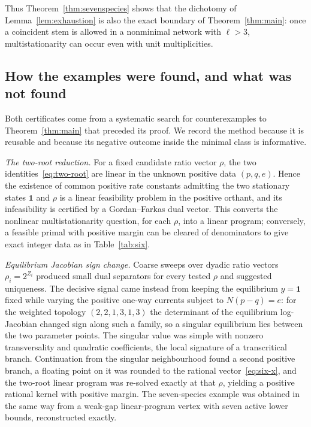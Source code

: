 \documentclass[11pt,reqno]{amsart}
\theoremstyle{plain}
\theoremstyle{definition}
\theoremstyle{remark}
\numberwithin{equation}{section}
\newcommand{\one}{\mathbf{1}}
\begin{document}
Thus Theorem~\ref{thm:sevenspecies} shows that the dichotomy of Lemma~\ref{lem:exhaustion} is also the exact boundary of Theorem~\ref{thm:main}: once a coincident stem is allowed in a nonminimal network with $\ell>3$, multistationarity can occur even with unit multiplicities.

\subsection{How the examples were found, and what was not found}\label{subsec:search}
Both certificates come from a systematic search for counterexamples to Theorem~\ref{thm:main} that preceded its proof.  We record the method because it is reusable and because its negative outcome inside the minimal class is informative.

\emph{The two-root reduction.}  For a fixed candidate ratio vector $\rho$, the two identities~\eqref{eq:two-root} are linear in the unknown positive data $(p,q,e)$.  Hence the existence of common positive rate constants admitting the two stationary states $\one$ and $\rho$ is a linear feasibility problem in the positive orthant, and its infeasibility is certified by a Gordan--Farkas dual vector.  This converts the nonlinear multistationarity question, for each $\rho$, into a linear program; conversely, a feasible primal with positive margin can be cleared of denominators to give exact integer data as in Table~\ref{tab:six}.

\emph{Equilibrium Jacobian sign change.}  Coarse sweeps over dyadic ratio vectors $\rho_i=2^{Z_i}$ produced small dual separators for every tested $\rho$ and suggested uniqueness.  The decisive signal came instead from keeping the equilibrium $y=\one$ fixed while varying the positive one-way currents subject to $N(p-q)=e$: for the weighted topology $(2,2,1,3,1,3)$ the determinant of the equilibrium log-Jacobian changed sign along such a family, so a singular equilibrium lies between the two parameter points.  The singular value was simple with nonzero transversality and quadratic coefficients, the local signature of a transcritical branch.  Continuation from the singular neighbourhood found a second positive branch, a floating point on it was rounded to the rational vector~\eqref{eq:six-x}, and the two-root linear program was re-solved exactly at that $\rho$, yielding a positive rational kernel with positive margin.  The seven-species example was obtained in the same way from a weak-gap linear-program vertex with seven active lower bounds, reconstructed exactly.
\end{document}
